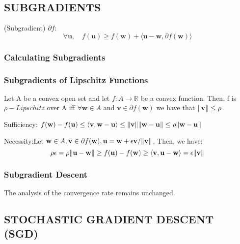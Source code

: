 \subsection{SUBGRADIENTS}
\begin{defn} (Subgradient) $ \partial f $:
	\begin{equation}
		\forall \mathbf{u}, \quad
		f(\mathbf{u}) \ge f(\mathbf{w}) + \langle \mathbf{u}-\mathbf{w}, \partial f(\mathbf{w}) \rangle
	\end{equation}
\end{defn}
\subsubsection{Calculating Subgradients}
\subsubsection{Subgradients of Lipschitz Functions}
\begin{lem}
	Let A be a convex open set and let $ f:A\rightarrow \mathbb{R} $ be a convex function.
	Then, f is $ \rho-Lipschitz $ over A iff $ \forall \mathbf{w} \in A $ and $ \mathbf{v} \in \partial f(\mathbf{w}) $
	we have that $ \Arrowvert \mathbf{v} \Arrowvert \le \rho $

	Sufficiency:
	$ f(\mathbf{w}) - f(\mathbf{u}) \le 
	\langle \mathbf{v}, \mathbf{w}-\mathbf{u} \rangle
	\le \Arrowvert \mathbf{v} \Arrowvert \Arrowvert \mathbf{w} - \mathbf{u} \Arrowvert
	\le \rho\Arrowvert \mathbf{w} - \mathbf{u} \Arrowvert$

	Necessity:Let $ \mathbf{w} \in A, \mathbf{v} \in \partial f(\mathbf{w}), 
	\mathbf{u} = \mathbf{w} + \epsilon \mathbf{v} / \Arrowvert \mathbf{v} \Arrowvert $, 
	Then, we have:
	\[ \rho \epsilon = \rho \Arrowvert \mathbf{u} - \mathbf{w} \Arrowvert \ge f(\mathbf{u}) - f(\mathbf{w})
	\ge \langle \mathbf{v, \mathbf{u} - \mathbf{w}} \rangle = \epsilon \Arrowvert \mathbf{v} \Arrowvert \]
\end{lem}

\subsubsection{Subgradient Descent}
The analysis of the convergence rate remains unchanged.

\subsection{STOCHASTIC GRADIENT DESCENT (SGD)}

